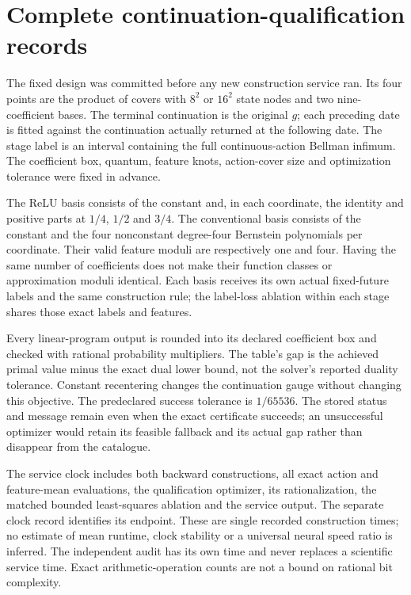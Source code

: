 \section{Complete continuation-qualification records}\label{supp:audit73}
The fixed design was committed before any new construction service ran. Its four points are the product of covers with $8^2$ or $16^2$ state nodes and two nine-coefficient bases. The terminal continuation is the original $g$; each preceding date is fitted against the continuation actually returned at the following date. The stage label is an interval containing the full continuous-action Bellman infimum. The coefficient box, quantum, feature knots, action-cover size and optimization tolerance were fixed in advance.



The ReLU basis consists of the constant and, in each coordinate, the identity and positive parts at $1/4$, $1/2$ and $3/4$. The conventional basis consists of the constant and the four nonconstant degree-four Bernstein polynomials per coordinate. Their valid feature moduli are respectively one and four. Having the same number of coefficients does not make their function classes or approximation moduli identical. Each basis receives its own actual fixed-future labels and the same construction rule; the label-loss ablation within each stage shares those exact labels and features.

Every linear-program output is rounded into its declared coefficient box and checked with rational probability multipliers. The table's gap is the achieved primal value minus the exact dual lower bound, not the solver's reported duality tolerance. Constant recentering changes the continuation gauge without changing this objective. The predeclared success tolerance is $1/65536$. The stored status and message remain even when the exact certificate succeeds; an unsuccessful optimizer would retain its feasible fallback and its actual gap rather than disappear from the catalogue.



The service clock includes both backward constructions, all exact action and feature-mean evaluations, the qualification optimizer, its rationalization, the matched bounded least-squares ablation and the service output. The separate clock record identifies its endpoint. These are single recorded construction times; no estimate of mean runtime, clock stability or a universal neural speed ratio is inferred. The independent audit has its own time and never replaces a scientific service time. Exact arithmetic-operation counts are not a bound on rational bit complexity.

